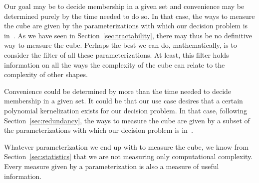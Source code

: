 Our goal may be to decide membership in a given set and convenience may be determined purely by the time needed to do so.
In that case, the ways to measure the cube are given by the parameterizations with which our decision problem is in~.
As we have seen in Section~\ref{sec:tractability}, there may thus be no definitive way to measure the cube.
Perhaps the best we can do, mathematically, is to consider the filter of all these parameterizations.
At least, this filter holds information on all the ways the complexity of the cube can relate to the complexity of other shapes.

Convenience could be determined by more than the time needed to decide membership in a given set.
It could be that our use case desires that a certain polynomial kernelization exists for our decision problem.
In that case, following Section~\ref{sec:redundancy}, the ways to measure the cube are given by a subset of the parameterizations with which our decision problem is in~.

Whatever parameterization we end up with to measure the cube, we know from Section~\ref{sec:statistics} that we are not measuring only computational complexity.
Every measure given by a parameterization is also a measure of useful information.


\label{sec:conclusion:history}%


